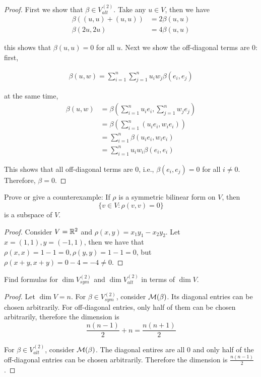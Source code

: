 \documentclass{extarticle}
\begin{document}
\begin{proof}
First we show that \(\beta \in V_{alt}^{(2)}\). Take any \(u \in V\), then we have 
\begin{align*}
    \beta((u, u) + (u, u)) &= 2 \beta(u, u) \\ 
    \beta(2u, 2u) &= 4 \beta(u, u)
\end{align*}

this shows that \(\beta(u, u) = 0\) for all \(u\). Next we show the off-diagonal terms are 0: first, 

\begin{align*}
    \beta(u, w) = \sum_{i=1}^{n} \sum_{j=1}^{n} u_i w_j \beta(e_i, e_j) \tag*{bilinearity}
\end{align*}

at the same time, 
\begin{align*}
    \beta(u, w) &= \beta \left( \sum_{i=1}^{n}u_i e_i, \sum_{j=1}^{n} w_j e_j \right) \\ 
    &= \beta \left( \sum_{i=1}^{n} \left( u_i e_i, w_i e_i \right) \right) \\ 
    &= \sum_{i=1}^{n} \beta \left( u_i e_i, w_i e_i \right) \tag*{linearity on \(V \times V\)}  \\ 
    &= \sum_{i=1}^{n} u_i w_i \beta(e_i, e_i)
\end{align*}

This shows that all off-diagonal terms are 0, i.e., \(\beta(e_i, e_j) = 0\) for all \(i \neq 0\). Therefore, 
\(\beta = 0\).
\end{proof}

\begin{problem}{6}
    Prove or give a counterexample: If \(\rho\) is a symmetric bilinear form on \(V\), then 
    \[\{v \in V \colon \rho (v, v) = 0\}\]
    is a subspace of \(V\). 
\end{problem}


\begin{proof}
Consider \(V = \mathbb{R}^2\) and \(\rho(x, y) = x_1 y_1 - x_2 y_2\). Let \(x = (1, 1), y = (-1, 1 )\), then we 
have that \(\rho(x, x) = 1 - 1 = 0, \rho(y, y) = 1 - 1 = 0\), but \(\rho(x+y, x+y) = 0 - 4 = -4 \neq 0\).
\end{proof}

\begin{problem}{8}
    Find formulas for \(\dim V_{sym}^{(2)}\) and \(\dim V_{alt}^{(2)}\) in terms of \(\dim V\). 
\end{problem}

\begin{proof}
Let \(\dim V = n\). For \(\beta \in V_{sym}^{(2)}\), consider \(\mathcal{M}(\beta)\). Its diagonal entries can be 
chosen arbitrarily. For off-diagonal entries, only half of them can be chosen arbitrarily, therefore the dimension 
is 
\[\frac{n(n-1)}{2} + n = \frac{n(n+1)}{2}\]

For \(\beta \in V_{alt}^{(2)}\), consider \(\mathcal{M}(\beta)\). The diagonal entires are all 0 and only half of the off-diagonal entries 
can be chosen arbitrarily. Therefore the dimension is 
\(\frac{n(n-1)}{2}\).
\end{proof}
\end{document}
